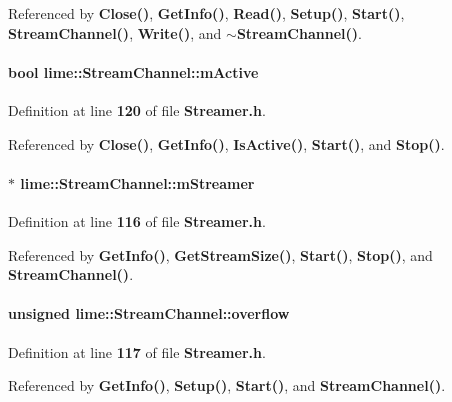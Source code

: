 Referenced by {\bf Close()}, {\bf Get\+Info()}, {\bf Read()}, {\bf Setup()}, {\bf Start()}, {\bf Stream\+Channel()}, {\bf Write()}, and {\bf $\sim$\+Stream\+Channel()}.

\paragraph[{m\+Active}]{\setlength{\rightskip}{0pt plus 5cm}bool lime\+::\+Stream\+Channel\+::m\+Active}\label{classlime_1_1StreamChannel_a011647e1a39ffebb16b1be31dd0cefaa}


Definition at line {\bf 120} of file {\bf Streamer.\+h}.



Referenced by {\bf Close()}, {\bf Get\+Info()}, {\bf Is\+Active()}, {\bf Start()}, and {\bf Stop()}.

\paragraph[{m\+Streamer}]{$\ast$ lime\+::\+Stream\+Channel\+::m\+Streamer}\label{classlime_1_1StreamChannel_a64be21022bda0e145ff2c3799eb162be}


Definition at line {\bf 116} of file {\bf Streamer.\+h}.



Referenced by {\bf Get\+Info()}, {\bf Get\+Stream\+Size()}, {\bf Start()}, {\bf Stop()}, and {\bf Stream\+Channel()}.

\paragraph[{overflow}]{\setlength{\rightskip}{0pt plus 5cm}unsigned lime\+::\+Stream\+Channel\+::overflow}\label{classlime_1_1StreamChannel_adb0b3fcd096dce1b697190d0541e0b3d}


Definition at line {\bf 117} of file {\bf Streamer.\+h}.



Referenced by {\bf Get\+Info()}, {\bf Setup()}, {\bf Start()}, and {\bf Stream\+Channel()}.

